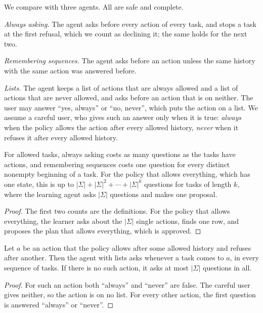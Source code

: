 \documentclass[acmsmall,nonacm,screen]{acmart}
\begin{document}
We compare with three agents. All are safe and complete.

\emph{Always asking.} The agent asks before every action of every task, and stops a task at
the first refusal, which we count as declining it; the same holds for the next two.

\emph{Remembering sequences.} The agent asks before an action unless the same history with
the same action was answered before.

\emph{Lists.} The agent keeps a list of actions that are always allowed and a list of
actions that are never allowed, and asks before an action that is on neither. The user may
answer ``yes, always'' or ``no, never'', which puts the action on a list. We assume a careful
user, who gives such an answer only when it is true: \emph{always} when the policy allows
the action after every allowed history, \emph{never} when it refuses it after every allowed
history.

\begin{proposition}
\label{prop:ask}
For allowed tasks, always asking costs as many questions as the tasks have actions, and
remembering sequences costs one question for every distinct nonempty beginning of a task.
For the policy that allows everything, which has one state, this is up to $|\Sigma| +
|\Sigma|^2 + \cdots + |\Sigma|^k$ questions for tasks of length $k$, where the learning
agent asks $|\Sigma|$ questions and makes one proposal.
\end{proposition}

\begin{proof}
The first two counts are the definitions. For the policy that allows everything, the learner
asks about the $|\Sigma|$ single actions, finds one row, and proposes the plan that allows
everything, which is approved.
\end{proof}

\begin{proposition}
\label{prop:list}
Let $a$ be an action that the policy allows after some allowed history and refuses after
another. Then the agent with lists asks whenever a task comes to $a$, in every sequence of
tasks. If there is no such action, it asks at most $|\Sigma|$ questions in all.
\end{proposition}

\begin{proof}
For such an action both ``always'' and ``never'' are false. The careful user gives neither,
so the action is on no list. For every other action, the first question is answered
``always'' or ``never''.
\end{proof}
\end{document}
